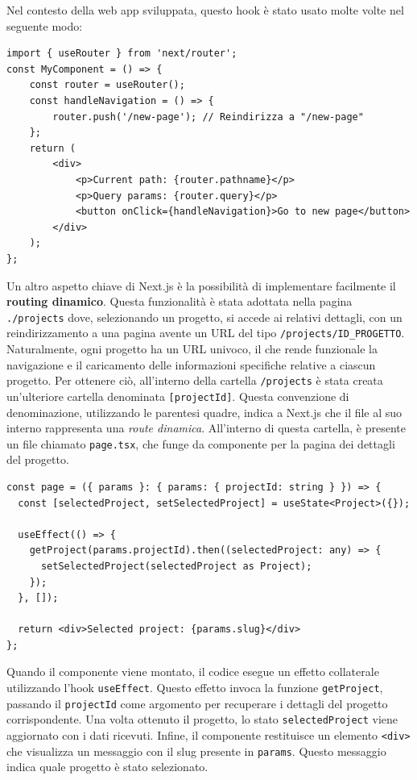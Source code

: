 \documentclass[target=bach,aauheader=,style=]{thud}
\begin{document}
\noindent Nel contesto della web app sviluppata, questo hook è stato usato molte volte nel seguente modo:

\begin{lstlisting}[caption=\texttt{useRouter} per la navigazione tra URL]
import { useRouter } from 'next/router';
const MyComponent = () => {
    const router = useRouter();
    const handleNavigation = () => {
        router.push('/new-page'); // Reindirizza a "/new-page"
    };
    return (
        <div>
            <p>Current path: {router.pathname}</p>
            <p>Query params: {router.query}</p>
            <button onClick={handleNavigation}>Go to new page</button>
        </div>
    );
};
\end{lstlisting}

\noindent Un altro aspetto chiave di Next.js è la possibilità di implementare facilmente il \textbf{routing dinamico}. Questa funzionalità è stata adottata nella pagina \texttt{./projects} dove, selezionando un progetto, si accede ai relativi dettagli, con un reindirizzamento a una pagina avente un URL del tipo \texttt{/projects/ID\_PROGETTO}. Naturalmente, ogni progetto ha un URL univoco, il che rende funzionale la navigazione e il caricamento delle informazioni specifiche relative a ciascun progetto. Per ottenere ciò, all'interno della cartella \texttt{/projects} è stata creata un'ulteriore cartella denominata \texttt{[projectId]}. Questa convenzione di denominazione, utilizzando le parentesi quadre, indica a Next.js che il file al suo interno rappresenta una \textit{route dinamica}. All'interno di questa cartella, è presente un file chiamato \texttt{page.tsx}, che funge da componente per la pagina dei dettagli del progetto.

\begin{lstlisting}[caption=Routing dinamico con Next.js]
const page = ({ params }: { params: { projectId: string } }) => {
  const [selectedProject, setSelectedProject] = useState<Project>({});
  
  useEffect(() => {
    getProject(params.projectId).then((selectedProject: any) => {
      setSelectedProject(selectedProject as Project);
    });
  }, []);

  return <div>Selected project: {params.slug}</div>
};
\end{lstlisting}

\noindent Quando il componente viene montato, il codice esegue un effetto collaterale utilizzando l'hook \texttt{useEffect}. Questo effetto invoca la funzione \texttt{getProject}, passando il \texttt{projectId} come argomento per recuperare i dettagli del progetto corrispondente. Una volta ottenuto il progetto, lo stato \texttt{selectedProject} viene aggiornato con i dati ricevuti. Infine, il componente restituisce un elemento \texttt{<div>} che visualizza un messaggio con il slug presente in \texttt{params}. Questo messaggio indica quale progetto è stato selezionato. 
\end{document}
